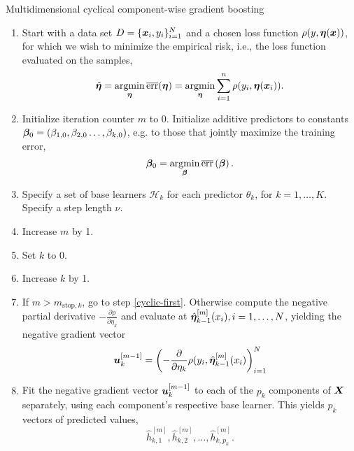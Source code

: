 \begin{algorithm}
\caption{Multidimensional cyclical component-wise gradient boosting}
\label{algo:multi-cyclical}
\begin{enumerate}
    \item
        Start with a data set $D=\{\bm{x}_i, y_i\}_{i=1}^N$ and a chosen loss function $\rho(y,\boldsymbol{\eta}(\bm{x}))$, for which we wish to
        minimize the empirical risk, i.e., the loss function evaluated on the samples,
        \begin{equation*}
            \hat{\boldsymbol{\eta}}=\operatorname*{argmin}_{\boldsymbol{\eta}}\overline{\text{err}}(\boldsymbol{\eta})=\operatorname*{argmin}_{\boldsymbol{\eta}}\sum_{i=1}^n \rho(y_i,\boldsymbol{\eta}(\bm{x}_i)).
        \end{equation*}
    \item
        Initialize iteration counter $m$ to 0.
        Initialize additive predictors to constants $\boldsymbol{\beta}_0=\left(\beta_{1,0},\beta_{2,0}\ldots,\beta_{k,0}\right)$, e.g. to those that jointly maximize the training error,
        \begin{equation*}
            \boldsymbol{\beta}_0=\operatorname*{argmin}_{\boldsymbol{\beta}}\overline{\text{err}}\left(\boldsymbol{\beta}\right).
        \end{equation*}
    \item
        \label{initialization}
        Specify a set of base learners $\mathcal{H}_k$ for each predictor $\theta_k$, for $k=1,\ldots,K$. Specify a step length $\nu$.
    \item
        \label{cyclic-proper-first}
        Increase $m$ by 1.
    \item
        Set $k$ to 0.
    \item
        \label{cyclic-first}
        Increase $k$ by 1.
    \item
        If $m>m_{\text{stop},k}$, go to step \ref{cyclic-first}.
        Otherwise compute the negative partial derivative $-\frac{\partial\rho}{\partial \eta_k}$ and evaluate at $\hat{\boldsymbol{\eta}}_{k-1}^{[m]}(x_i),i=1,\ldots,N$, yielding the negative gradient vector
        \begin{equation*}
            \bm{u}^{[m-1]}_k=\left(-\frac{\partial}{\partial \eta_k}\rho(y_i, \hat{\boldsymbol{\eta}}_{k-1}^{[m]}(x_i)\right)_{i=1}^N
        \end{equation*}
    \item
        Fit the negative gradient vector $\bm{u}_k^{[m-1]}$ to each of the $p_k$ components of $\bm{X}$ separately, using each component's respective base learner.
        This yields $p_k$ vectors of predicted values,
        \begin{equation*}
            \hat{h}_{k,1}^{[m]},\hat{h}_{k,2}^{[m]},\ldots,\hat{h}_{k,p_k}^{[m]}.

\end{equation*}
\end{enumerate}
\end{algorithm}
